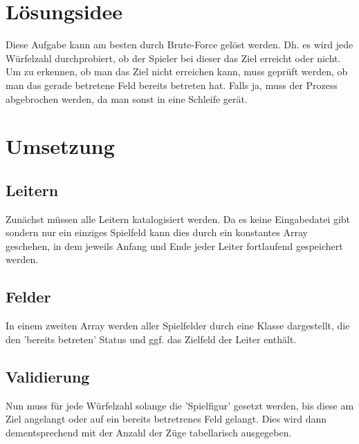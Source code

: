 \documentclass[a4paper,10pt,ngerman]{scrartcl}
\title{\Aufgabe}
\author{\Name\\Team-ID: \TeamId}
\date{\today}
\begin{document}
\maketitle
\tableofcontents

\section{Lösungsidee}
Diese Aufgabe kann am besten durch Brute-Force gelöst werden. Dh. es wird jede Würfelzahl durchprobiert, ob der Spieler bei dieser das Ziel erreicht oder nicht. Um zu erkennen, ob man das Ziel nicht erreichen kann, muss geprüft werden, ob man das gerade betretene Feld bereits betreten hat. Falls ja, muss der Prozess abgebrochen werden, da man sonst in eine Schleife gerät.


\section{Umsetzung}

\subsection{Leitern}
Zunächst müssen alle Leitern katalogisiert werden. Da es keine Eingabedatei gibt sondern nur ein einziges Spielfeld kann dies durch ein konstantes Array geschehen, in dem jeweils Anfang und Ende jeder Leiter fortlaufend gespeichert werden.

\subsection{Felder}
In einem zweiten Array werden aller Spielfelder durch eine Klasse dargestellt, die den 'bereits betreten' Status und ggf. das Zielfeld der Leiter enthält.

\subsection{Validierung}
Nun muss für jede Würfelzahl solange die 'Spielfigur' gesetzt werden, bis diese am Ziel angelangt oder auf ein bereits betretrenes Feld gelangt. Dies wird dann dementsprechend mit der Anzahl der Züge tabellarisch ausgegeben.

\end{document}
